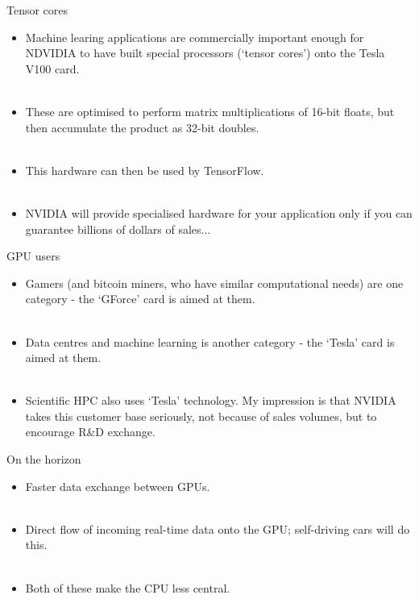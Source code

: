 \documentclass[usenames,dvipsnames]{beamer}
\begin{document}
\begin{frame}{Tensor cores}
  \begin{block}{}
    \begin{itemize}
      \item{Machine learing applications are commercially important enough for NDVIDIA to have built special processors (`tensor cores') onto the Tesla V100 card.}\\~\
      \item{These are optimised to perform matrix multiplications of 16-bit floats, but then accumulate the product as 32-bit doubles.}\\~\
      \item{This hardware can then be used by TensorFlow.}\\~\
      \item{NVIDIA will provide specialised hardware for your application only if you can guarantee billions of dollars of sales...}
    \end{itemize}
  \end{block}
\end{frame}

\begin{frame}{GPU users}
  \begin{block}{}
    \begin{itemize}
      \item{Gamers (and bitcoin miners, who have similar computational needs) are one category - the `GForce' card is aimed at them.}\\~\
      \item{Data centres and machine learning is another category - the `Tesla' card is aimed at them.}\\~\
      \item{Scientific HPC also uses `Tesla' technology. My impression is that NVIDIA takes this customer base seriously, not because of sales volumes, but to encourage R\&D exchange.}
    \end{itemize}
  \end{block}
\end{frame}

\begin{frame}{On the horizon}
  \begin{block}{}
    \begin{itemize}
      \item{Faster data exchange between GPUs.}\\~\
      \item{Direct flow of incoming real-time data onto the GPU; self-driving cars will do this.}\\~\
      \item{Both of these make the CPU less central.}
    \end{itemize}
  \end{block}
\end{frame}
\end{document}

